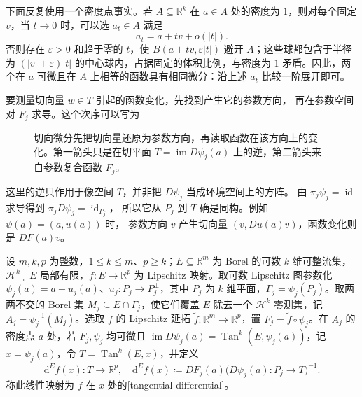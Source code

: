 \ProseParagraphBreak

下面反复使用一个密度点事实。若 \(A\subseteq\mathbb R^k\) 在 \(a\in A\) 处的密度为 \(1\)，则对每个固定 \(v\)，当 \(t\to0\) 时，可以选 \(a_t\in A\) 满足
\[
 a_t=a+tv+o(|t|).
\]
否则存在 \(\varepsilon>0\) 和趋于零的 \(t\)，使 \(B(a+tv,\varepsilon|t|)\) 避开 \(A\)；这些球都包含于半径为 \((|v|+\varepsilon)|t|\) 的中心球内，占据固定的体积比例，与密度为 \(1\) 矛盾。因此，两个在 \(a\) 可微且在 \(A\) 上相等的函数具有相同微分：沿上述 \(a_t\) 比较一阶展开即可。

要测量切向量 \(w\in T\) 引起的函数变化，先找到产生它的参数方向，
再在参数空间对 \(F_j\) 求导。这个次序可以写为
\begin{figure}[htbp]
\centering
{}
\caption[切向微分的参数通路]{切向微分先把切向量还原为参数方向，再读取函数在该方向上的变化。第一箭头只是在切平面 \(T=\operatorname{im}D\psi_j(a)\) 上的逆，第二箭头来自参数复合函数 \(F_j\)。}
\label{b1:fig:tangential-differential-route}
\end{figure}
这里的逆只作用于像空间 \(T\)，并非把 \(D\psi_j\) 当成环境空间上的方阵。
由 \(\pi_j\psi_j=\operatorname{id}\) 求导得到 \(\pi_jD\psi_j=\operatorname{id}_{P_j}\)，
所以它从 \(P_j\) 到 \(T\) 确是同构。例如 \(\psi(a)=(a,u(a))\) 时，
参数方向 \(v\) 产生切向量 \((v,Du(a)v)\)，函数变化则是 \(DF(a)v\)。

\begin{definition}
\label{b1:def:tangential-differential}
设 \(m,k,p\) 为整数，\(1\leq k\leq m\)、\(p\geq k\)；\(E\subseteq\mathbb R^m\) 为 Borel 的可数 \(k\) 维可整流集，\(\mathcal H^k\llcorner E\) 局部有限，\(f:E\to\mathbb R^p\) 为 Lipschitz 映射。取可数 Lipschitz 图参数化 \(\psi_j(a)=a+u_j(a)\)、\(u_j:P_j\to P_j^\perp\)，其中 \(P_j\) 为 \(k\) 维平面，\(\Gamma_j=\psi_j(P_j)\)。取两两不交的 Borel 集 \(M_j\subseteq E\cap\Gamma_j\)，使它们覆盖 \(E\) 除去一个 \(\mathcal H^k\) 零测集，记 \(A_j=\psi_j^{-1}(M_j)\)。选取 \(f\) 的 Lipschitz 延拓 \(\widetilde f:\mathbb R^m\to\mathbb R^p\)，置 \(F_j=\widetilde f\circ\psi_j\)。在 \(A_j\) 的密度点 \(a\) 处，若 \(F_j,\psi_j\) 均可微且 \(\operatorname{im}D\psi_j(a)=\operatorname{Tan}^k(E,\psi_j(a))\)，记 \(x=\psi_j(a)\)，令 \(T=\operatorname{Tan}^k(E,x)\)，并定义
\[
 \mathrm{d}^Ef(x):T\longrightarrow\mathbb R^p,\quad
 \mathrm{d}^Ef(x)\coloneqq DF_j(a)\bigl(D\psi_j(a):P_j\rightarrow T\bigr)^{-1}.
\]
称此线性映射为 \(f\) 在 \(x\) 处的[tangential differential]。
\end{definition}

